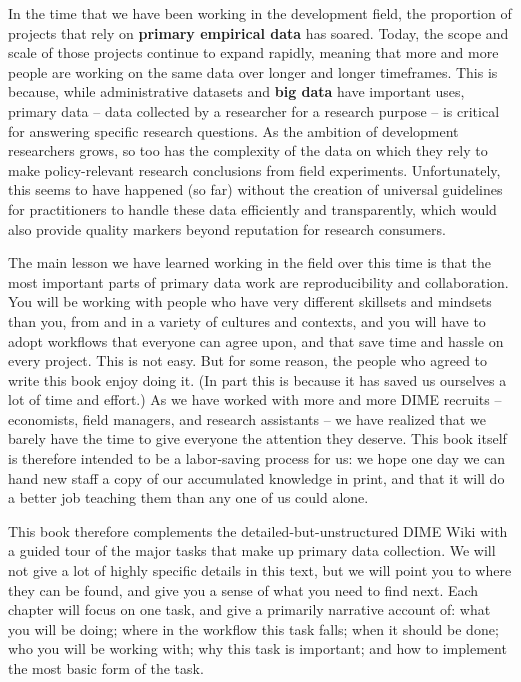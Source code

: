 In the time that we have been working in the development field,
the proportion of projects that rely on \textbf{primary empirical data} has soared.\cite{angrist2017economic}
Today, the scope and scale of those projects continue to expand rapidly,
meaning that more and more people are working on the same data over longer and longer timeframes.
This is because, while administrative datasets
and \textbf{big data} have important uses,
primary data -- data collected by a researcher for a research purpose --
is critical for answering specific research questions.\cite{levitt2009field}
As the ambition of development researchers grows, so too has the complexity of the data
on which they rely to make policy-relevant research conclusions from field experiments.
Unfortunately, this seems to have happened (so far) without the creation of
universal guidelines for practitioners to handle these data efficiently and transparently,
which would also provide quality markers beyond reputation for research consumers.

The main lesson we have learned working in the field over this time is that
the most important parts of primary data work are reproducibility and collaboration.
You will be working with people who have very different skillsets and mindsets than you,
from and in a variety of cultures and contexts, and you will have to adopt workflows
that everyone can agree upon, and that save time and hassle on every project.
This is not easy. But for some reason, the people who agreed to write this book enjoy doing it.
(In part this is because it has saved us ourselves a lot of time and effort.)
As we have worked with more and more DIME recruits
-- economists, field managers, and research assistants --
we have realized that we barely have the time to give everyone the attention they deserve.
This book itself is therefore intended to be a labor-saving process for us:
we hope one day we can hand new staff a copy of our accumulated knowledge in print,
and that it will do a better job teaching them than any one of us could alone.

This book therefore complements the detailed-but-unstructured DIME Wiki
with a guided tour of the major tasks that make up primary data collection.
We will not give a lot of highly specific details in this text,
but we will point you to where they can be found,
and give you a sense of what you need to find next.
Each chapter will focus on one task,
and give a primarily narrative account of:
what you will be doing; where in the workflow this task falls;
when it should be done; who you will be working with;
why this task is important; and how to implement the most basic form of the task.


